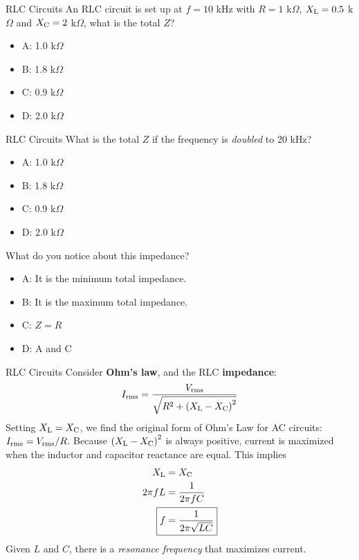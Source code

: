 \documentclass{beamer}
\begin{document}
\begin{frame}{RLC Circuits}
An RLC circuit is set up at $f = 10$ kHz with $R = 1$ k$\Omega$, $X_{\rm L} = 0.5$ k$\Omega$ and $X_{\rm C} = 2$ k$\Omega$, what is the total $Z$?
\begin{itemize}
\item A: 1.0 k$\Omega$
\item B: 1.8 k$\Omega$
\item C: 0.9 k$\Omega$
\item D: 2.0 k$\Omega$
\end{itemize}
\end{frame}

\begin{frame}{RLC Circuits}
What is the total $Z$ if the frequency is \textit{doubled} to 20 kHz?
\begin{itemize}
\item A: 1.0 k$\Omega$
\item B: 1.8 k$\Omega$
\item C: 0.9 k$\Omega$
\item D: 2.0 k$\Omega$
\end{itemize}
What do you notice about this impedance?
\begin{itemize}
\item A: It is the minimum total impedance.
\item B: It is the maximum total impedance.
\item C: $Z = R$
\item D: A and C
\end{itemize}
\end{frame}

\begin{frame}{RLC Circuits}
\small
Consider \textbf{\alert{Ohm's law}}, and the RLC \textbf{\alert{impedance}}:
\begin{equation}
I_{\rm rms} = \frac{V_{\rm rms}}{\sqrt{R^2 + \left(X_{\rm L} - X_{\rm C} \right)^2}}
\end{equation}
Setting $X_{\rm L} = X_{\rm C}$, we find the original form of Ohm's Law for AC circuits: $I_{\rm rms} = V_{\rm rms}/R$.  Because $\left(X_{\rm L} - X_{\rm C} \right)^2$ is always positive, current is maximized when the inductor and capacitor reactance are equal.  This implies
\begin{align}
X_{\rm L} &= X_{\rm C} \\
2\pi f L &= \frac{1}{2\pi f C} \\
\Aboxed{f &= \frac{1}{2\pi\sqrt{LC}}} \label{eq:f0}
\end{align}
Given $L$ and $C$, there is a \textit{resonance frequency} that maximizes current.
\end{frame}
\end{document}
